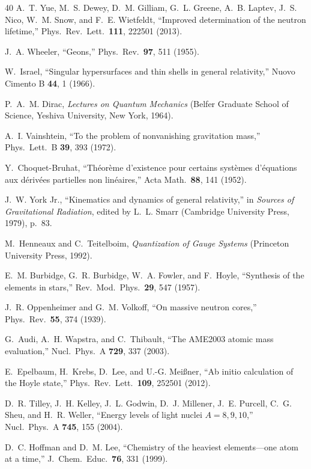\documentclass[aps,prd,preprint,superscriptaddress,showpacs,preprintnumbers,amsmath,amssymb,nofootinbib]{revtex4-2}
\begin{document}
\begin{thebibliography}{40}
A.~T. Yue, M.~S. Dewey, D.~M. Gilliam, G.~L. Greene, A.~B. Laptev, J.~S. Nico, W.~M. Snow, and F.~E. Wietfeldt, ``Improved determination of the neutron lifetime,'' Phys.\ Rev.\ Lett.\ \textbf{111}, 222501 (2013).

J.~A. Wheeler, ``Geons,'' Phys.\ Rev.\ \textbf{97}, 511 (1955).

W.~Israel, ``Singular hypersurfaces and thin shells in general relativity,'' Nuovo Cimento B \textbf{44}, 1 (1966).

P.~A.~M. Dirac, \emph{Lectures on Quantum Mechanics} (Belfer Graduate School of Science, Yeshiva University, New York, 1964).

A.~I. Vainshtein, ``To the problem of nonvanishing gravitation mass,'' Phys.\ Lett.\ B \textbf{39}, 393 (1972).

Y.~Choquet-Bruhat, ``Th\'eor\`eme d'existence pour certains syst\`emes d'\'equations aux d\'eriv\'ees partielles non lin\'eaires,'' Acta Math.\ \textbf{88}, 141 (1952).

J.~W. York Jr., ``Kinematics and dynamics of general relativity,'' in \emph{Sources of Gravitational Radiation}, edited by L.~L. Smarr (Cambridge University Press, 1979), p.~83.

M.~Henneaux and C.~Teitelboim, \emph{Quantization of Gauge Systems} (Princeton University Press, 1992).

E.~M. Burbidge, G.~R. Burbidge, W.~A. Fowler, and F.~Hoyle, ``Synthesis of the elements in stars,'' Rev.\ Mod.\ Phys.\ \textbf{29}, 547 (1957).

J.~R. Oppenheimer and G.~M. Volkoff, ``On massive neutron cores,'' Phys.\ Rev.\ \textbf{55}, 374 (1939).

G.~Audi, A.~H. Wapstra, and C.~Thibault, ``The AME2003 atomic mass evaluation,'' Nucl.\ Phys.\ A \textbf{729}, 337 (2003).

E.~Epelbaum, H.~Krebs, D.~Lee, and U.-G. Mei{\ss}ner, ``Ab initio calculation of the Hoyle state,'' Phys.\ Rev.\ Lett.\ \textbf{109}, 252501 (2012).

D.~R. Tilley, J.~H. Kelley, J.~L. Godwin, D.~J. Millener, J.~E. Purcell, C.~G. Sheu, and H.~R. Weller, ``Energy levels of light nuclei $A = 8, 9, 10$,'' Nucl.\ Phys.\ A \textbf{745}, 155 (2004).

D.~C. Hoffman and D.~M. Lee, ``Chemistry of the heaviest elements---one atom at a time,'' J.\ Chem.\ Educ.\ \textbf{76}, 331 (1999).

\end{thebibliography}
\end{document}
